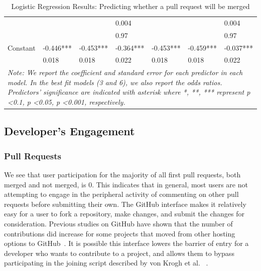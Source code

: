 \documentclass{sigchi}
\begin{document}
\begin{table}[ht]
\begin{tabular}{lllllll}
 &  &  & 0.004 &  &  & 0.004 \\
 &  &  & 0.97 &  &  & 0.97 \\
Constant & -0.446*** & -0.453*** & -0.364*** & -0.453*** & -0.459*** & 
-0.037*** \\
 & 0.018 & 0.018 & 0.022 & 0.018 & 0.018 & 0.022 \\ \hline
\multicolumn{7}{p{40em}}{\textit{Note: We report the coefficient and standard 
error for each predictor in each model. In the best fit models (3 and 6), we 
also report the odds ratios. Predictors' significance are indicated with 
asterisk where *, **, *** represent p \textless 0.1, p \textless 0.05, p 
\textless 0.001, respectively.}}
\end{tabular}
\caption{Logistic Regression Results: Predicting whether a pull request will be 
merged}  
\label{tab:logit_reg}
\end{table} 

\subsection{Developer's Engagement} \label{results_engagement}

\subsubsection{Pull Requests}

We see that user participation for the majority of all first pull requests, both
merged and not merged, is 0. This indicates that in general, most users are not
attempting to engage in the peripheral activity of commenting on other pull
requests before submitting their own. The GitHub interface makes it relatively
easy for a user to fork a repository, make changes, and submit the changes for
consideration. Previous studies on GitHub have shown that the number of
contributions did increase for some projects that moved from other hosting
options to GitHub~\cite{mcdonald_performance_2013}. It is possible this
interface lowers the barrier of entry for a developer who wants to contribute to
a project, and allows them to bypass participating in the joining script
described by von Krogh et al. ~\cite{von_krogh_community_2003}.
\end{document}
